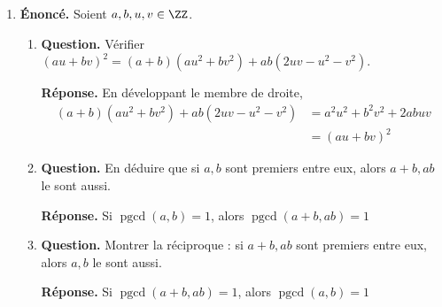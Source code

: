 \documentclass[12pt, a4paper]{article}
\begin{document}
\begin{enumerate}[label=2.\arabic*., start=17]
\begin{minipage}[t]{\linewidth}
\begin{enumerate}[\arabic*.]
\end{enumerate}
\end{minipage}

  \item \begin{minipage}[t]{\linewidth}\raggedright
\textbf{Énoncé.} Soient $a,b,u,v\in\ZZ$.

\begin{enumerate}[\arabic*.]
        \item \textbf{Question.} Vérifier $(au+bv)^2=(a+b)(au^2+bv^2)+ab(2uv-u^2-v^2)$.
\par\smallskip
\textbf{Réponse.} En développant le membre de droite,
        \begin{align*}
          (a+b)(au^2+bv^2) + ab(2uv-u^2-v^2)
          &= a^2u^2 + b^2v^2 + 2abuv\\
          &= (au+bv)^2
        \end{align*}

  \item \textbf{Question.} En déduire que si $a,b$ sont premiers entre eux, alors $a+b,ab$ le sont aussi.
\par\smallskip
\textbf{Réponse.} Si $\operatorname{pgcd}(a,b) = 1$, alors $\operatorname{pgcd}(a+b,ab) = 1$

  \item \textbf{Question.} Montrer la réciproque : si $a+b,ab$ sont premiers entre eux, alors $a,b$ le sont aussi.
\par\smallskip
\textbf{Réponse.} Si $\operatorname{pgcd}(a+b,ab) = 1$, alors $\operatorname{pgcd}(a,b) = 1$


\end{enumerate}
\end{minipage}
\end{enumerate}
\end{document}
